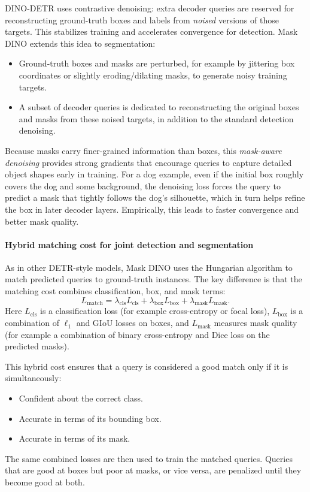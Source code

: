 \begin{enrichment}
\begin{enrichment}
		DINO-DETR uses contrastive denoising: extra decoder queries are reserved for reconstructing ground-truth boxes and labels from \emph{noised} versions of those targets.
		This stabilizes training and accelerates convergence for detection.
		Mask DINO extends this idea to segmentation:
		\begin{itemize}
			\item Ground-truth boxes and masks are perturbed, for example by jittering box coordinates or slightly eroding/dilating masks, to generate noisy training targets.
			\item A subset of decoder queries is dedicated to reconstructing the original boxes and masks from these noised targets, in addition to the standard detection denoising.
		\end{itemize}
		
		Because masks carry finer-grained information than boxes, this \emph{mask-aware denoising} provides strong gradients that encourage queries to capture detailed object shapes early in training.
		For a dog example, even if the initial box roughly covers the dog and some background, the denoising loss forces the query to predict a mask that tightly follows the dog's silhouette, which in turn helps refine the box in later decoder layers.
		Empirically, this leads to faster convergence and better mask quality.
		
		\paragraph{Hybrid matching cost for joint detection and segmentation}
		
		As in other DETR-style models, Mask DINO uses the Hungarian algorithm to match predicted queries to ground-truth instances.
		The key difference is that the matching cost combines classification, box, and mask terms:
		\[
		L_{\text{match}} =
		\lambda_{\text{cls}} L_{\text{cls}}
		+ \lambda_{\text{box}} L_{\text{box}}
		+ \lambda_{\text{mask}} L_{\text{mask}}.
		\]
		Here $L_{\text{cls}}$ is a classification loss (for example cross-entropy or focal loss), $L_{\text{box}}$ is a combination of $\ell_1$ and GIoU losses on boxes, and $L_{\text{mask}}$ measures mask quality (for example a combination of binary cross-entropy and Dice loss on the predicted masks).
		
		This hybrid cost ensures that a query is considered a good match only if it is simultaneously:
		\begin{itemize}
			\item Confident about the correct class.
			\item Accurate in terms of its bounding box.
			\item Accurate in terms of its mask.
		\end{itemize}
		The same combined losses are then used to train the matched queries.
		Queries that are good at boxes but poor at masks, or vice versa, are penalized until they become good at both.
		

\end{enrichment}
\end{enrichment}
